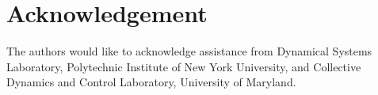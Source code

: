 \documentclass[12pt]{article}
\begin{document}
\begin{enumerate}
\end{enumerate}


\section{Acknowledgement}
The authors would like to acknowledge assistance from Dynamical Systems Laboratory, Polytechnic Institute of New York University, and Collective Dynamics and Control Laboratory, University of Maryland.




\end{document}
